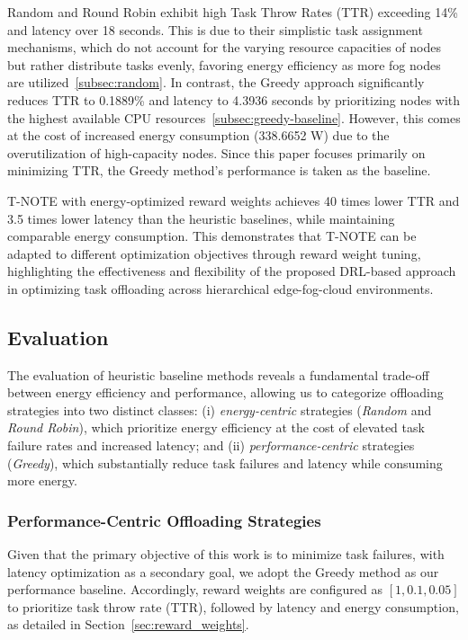 \documentclass[preprint,3p,authoryear]{elsarticle}
\begin{document}
Random and Round Robin exhibit high Task Throw Rates (TTR) exceeding 14\% and latency over 18 seconds. This is due to their simplistic task assignment mechanisms, which do not account for the varying resource capacities of nodes but rather distribute tasks evenly, favoring energy efficiency as more fog nodes are utilized~\ref{subsec:random}. In contrast, the Greedy approach significantly reduces TTR to 0.1889\% and latency to 4.3936 seconds by prioritizing nodes with the highest available CPU resources~\ref{subsec:greedy-baseline}. However, this comes at the cost of increased energy consumption (338.6652 W) due to the overutilization of high-capacity nodes. Since this paper focuses primarily on minimizing TTR, the Greedy method's performance is taken as the baseline.

T-NOTE with energy-optimized reward weights achieves 40 times lower TTR and 3.5 times lower latency than the heuristic baselines, while maintaining comparable energy consumption. This demonstrates that T-NOTE can be adapted to different optimization objectives through reward weight tuning, highlighting the effectiveness and flexibility of the proposed DRL-based approach in optimizing task offloading across hierarchical edge-fog-cloud environments.


\subsection{Evaluation}

The evaluation of heuristic baseline methods reveals a fundamental trade-off between energy efficiency and performance, allowing us to categorize offloading strategies into two distinct classes: (i) \emph{energy-centric} strategies (\emph{Random} and \emph{Round Robin}), which prioritize energy efficiency at the cost of elevated task failure rates and increased latency; and (ii) \emph{performance-centric} strategies (\emph{Greedy}), which substantially reduce task failures and latency while consuming more energy.

\subsubsection{Performance-Centric Offloading Strategies}\label{subsec:comparison_of_offloading_strategies}

Given that the primary objective of this work is to minimize task failures, with latency optimization as a secondary goal, we adopt the Greedy method as our performance baseline. Accordingly, reward weights are configured as $[1, 0.1, 0.05]$ to prioritize task throw rate (TTR), followed by latency and energy consumption, as detailed in Section~\ref{sec:reward_weights}.
\end{document}
